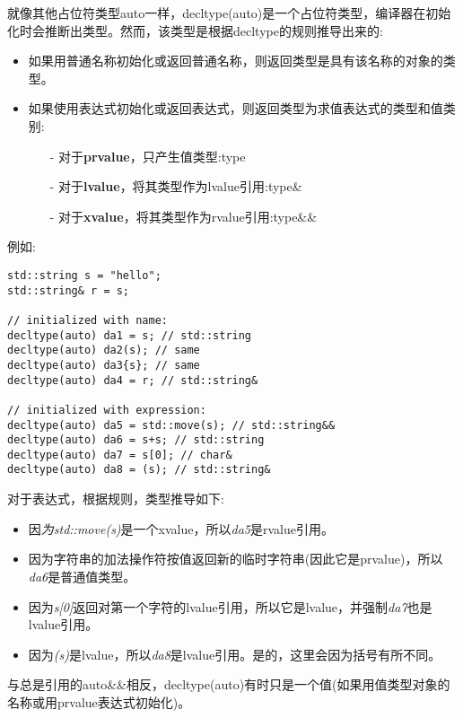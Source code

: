 就像其他占位符类型auto一样，decltype(auto)是一个占位符类型，编译器在初始化时会推断出类型。然而，该类型是根据decltype的规则推导出来的:\par

\begin{itemize}
	\item 如果用普通名称初始化或返回普通名称，则返回类型是具有该名称的对象的类型。
	\item 如果使用表达式初始化或返回表达式，则返回类型为求值表达式的类型和值类别:
	\begin{itemize}
		\item[-] 对于\textbf{prvalue}，只产生值类型:type
		\item[-] 对于\textbf{lvalue}，将其类型作为lvalue引用:type\&
		\item[-] 对于\textbf{xvalue}，将其类型作为rvalue引用:type\&\&
	\end{itemize}
\end{itemize}

例如:\par

\begin{lstlisting}[caption={}]
std::string s = "hello";
std::string& r = s;

// initialized with name:
decltype(auto) da1 = s; // std::string
decltype(auto) da2(s); // same
decltype(auto) da3{s}; // same
decltype(auto) da4 = r; // std::string&

// initialized with expression:
decltype(auto) da5 = std::move(s); // std::string&&
decltype(auto) da6 = s+s; // std::string
decltype(auto) da7 = s[0]; // char&
decltype(auto) da8 = (s); // std::string&
\end{lstlisting}

对于表达式，根据规则，类型推导如下:\par

\begin{itemize}
	\item 因\textit{为std::move(s)}是一个xvalue，所以\textit{da5}是rvalue引用。
	\item 因为字符串的加法操作符按值返回新的临时字符串(因此它是prvalue)，所以\textit{da6}是普通值类型。
	\item 因为\textit{s[0]}返回对第一个字符的lvalue引用，所以它是lvalue，并强制\textit{da7}也是lvalue引用。
	\item 因为\textit{(s)}是lvalue，所以\textit{da8}是lvalue引用。是的，这里会因为括号有所不同。
\end{itemize}

与总是引用的auto\&\&相反，decltype(auto)有时只是一个值(如果用值类型对象的名称或用prvalue表达式初始化)。\par

